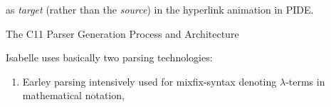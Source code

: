 \begin{isabellebody}
\begin{isamarkuptext}
as \emph{target} (rather than the \emph{source}) in the hyperlink animation in PIDE.%
\end{isamarkuptext}\isamarkuptrue%
%
\begin{isamarkupsection*}%
[label = {frontend_arch},type = {scholarly_paper.technical}, args={label = {frontend_arch},type = {scholarly_paper.technical}, scholarly_paper.text_section.main_author = {@{docitem ''bu''}}, Isa_COL.text_element.level = {}, Isa_COL.text_element.referentiable = {False}, Isa_COL.text_element.variants = {{STR ''outline'', STR ''document''}}, scholarly_paper.text_section.fixme_list = {}, Isa_COL.text_element.level = {}, scholarly_paper.technical.definition_list = {}}]The C11 Parser Generation Process and Architecture%
\end{isamarkupsection*}\isamarkuptrue%
%
\begin{isamarkuptext}%
Isabelle uses basically two parsing technologies:

%
\begin{enumerate}%
\item Earley parsing \cite{DBLP:journals/cacm/Earley70}
intensively used for mixfix-syntax denoting $\lambda$-terms in mathematical notation,


\end{enumerate}
\end{isamarkuptext}
\end{isabellebody}
